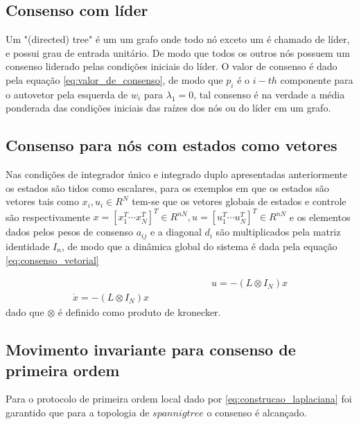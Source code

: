 \subsection{Consenso com líder}
Um "(directed) tree" é um um grafo onde todo nó exceto um é chamado de líder, e possui grau de entrada unitário. De modo que todos os outros nós possuem um consenso liderado pelas condições iniciais do líder.
O valor de consenso é dado pela equação \ref{eq:valor_de_consenso}, de modo que $p_{i}$ é o $i-{th}$ componente para o autovetor pela esquerda de $w_{i}$ para $\lambda_{1} = 0$, tal consenso é na verdade a média ponderada das condições iniciais das raízes dos nós ou do líder em um grafo. 

\subsection{Consenso para nós com estados como vetores}
Nas condições de integrador único e integrado duplo apresentadas anteriormente os estados são tidos como escalares, para os exemplos em que os estados são vetores tais como $x_{i}, u_{i} \in R^{N}$ tem-se que os vetores globais de estados e controle são respectivamente $x = [x_{1}^{T} \cdots x_{N}^{T}]^{T} \in R^{nN} , 
u = [u_{1}^{T}  \cdots u_{N}^{T}]^{T} \in R^{nN} $ e os elementos dados pelos pesos de consenso $a_{ij}$ e a diagonal $d_{i}$ são multiplicados pela matriz identidade $I_{n}$, de modo que a dinâmica global do sistema é dada pela equação \ref{eq:consenso_vetorial}

\begin{equation}\label{eq:consenso_vetorial}
 \begin{aligned}
 \hspace{6cm} %
    u = -(L \otimes I_{N})x \\
    \dot x = -(L \otimes I_{N}) x
    \end{aligned}
\end{equation}
dado que $\otimes$ é definido como produto de kronecker.

\subsection{Movimento invariante para consenso de primeira ordem}
Para o protocolo de primeira ordem local dado por \ref{eq:construcao_laplaciana} foi garantido que para a topologia de $spannig tree$ o consenso é alcançado. 



